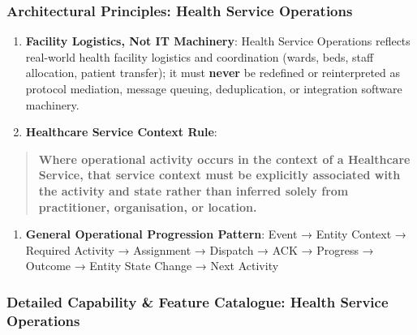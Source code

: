 \subsubsection*{Architectural Principles: Health Service Operations}
\label{rad:enabling:471}

\begin{enumerate}

\item
\textbf{Facility Logistics, Not IT Machinery}: Health Service Operations reflects real-world health facility logistics and coordination (wards, beds, staff allocation, patient transfer); it must \textbf{never} be redefined or reinterpreted as protocol mediation, message queuing, deduplication, or integration software machinery.



\item
\textbf{Healthcare Service Context Rule}:



\end{enumerate}
\label{rad:enabling:473}

\begin{quote}

\textbf{Where operational activity occurs in the context of a Healthcare Service, that service context must be explicitly associated with the activity and state rather than inferred solely from practitioner, organisation, or location.}


\end{quote}
\label{rad:enabling:474}

\begin{enumerate}

\item
\textbf{General Operational Progression Pattern}: Event → Entity Context → Required Activity → Assignment → Dispatch → ACK → Progress → Outcome → Entity State Change → Next Activity



\end{enumerate}
\label{rad:enabling:477}

\par\smallskip
{}\label{rad:enabling:479}
\subsubsection*{Detailed Capability \& Feature Catalogue: Health Service Operations}
\label{rad:enabling:481}
